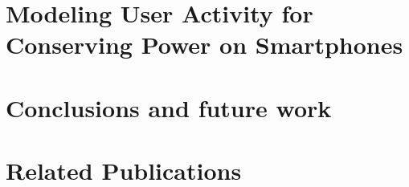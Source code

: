 \documentclass[11pt]{book}
\begin{document}
%

\chapter{Modeling User Activity for Conserving Power on Smartphones}
\label{ch:chap5}



\chapter{Conclusions and future work}
\label{ch:conc}



\chapter*{Related Publications}
\label{ch:relatedPubs}




 
\end{document}
